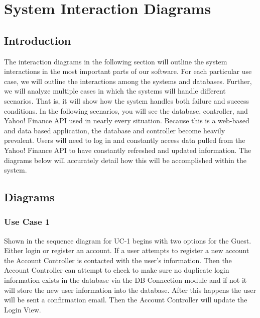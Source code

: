 \chapter{System Interaction Diagrams}


\section{Introduction}

The interaction diagrams in the following section will outline the system
interactions in the most important parts of our software. For each particular
use case, we will outline the interactions among the systems and databases.
Further, we will analyze multiple cases in which the systems will handle
different scenarios. That is, it will show how the system handles both failure
and success conditions. In the following scenarios, you will see the database,
controller, and Yahoo! Finance API used in nearly every situation. Because this
is a web-based and data based application, the database and controller become
heavily prevalent. Users will need to log in and constantly access data pulled
from the Yahoo! Finance API to have constantly refreshed and updated
information. The diagrams below will accurately detail how this will be
accomplished within the system.

\section{Diagrams}

\subsection{Use Case 1}

Shown in the sequence diagram for UC-1 begins with two options for the Guest.
Either login or register an account. If a user attempts to register a new
account the Account Controller is contacted with the user’s information. Then
the Account Controller can attempt to check to make sure no duplicate login
information exists in the database via the DB Connection module and if not it
will store the new user information into the database. After this happens the
user will be sent a confirmation email. Then the Account Controller will update
the Login View.\\

